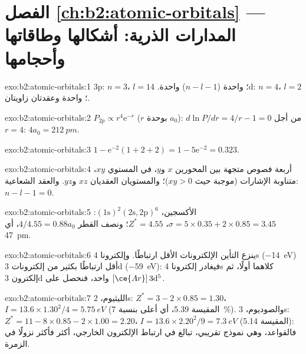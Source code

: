 \section*{الفصل \ref{ch:b2:atomic-orbitals} --- المدارات الذرية: أشكالها وطاقاتها وأحجامها}

\begin{solution}{exo:b2:atomic-orbitals:1}
3p: $n = 3$، $l = 1$؛  واحدة ($n - l - 1$)  واحدة. 4d: $n = 4$،
$l = 2$؛  واحدة وعقدتان زاويتان.
\end{solution}

\begin{solution}{exo:b2:atomic-orbitals:2}
$P_{2p} \propto r^4\mathrm e^{-r}$ ($r$ بوحدة $a_0$): $d\ln P/dr = 4/r - 1 = 0$ من أجل $r = 4$:
$4a_0 = \qty{212}{pm}$.
\end{solution}

\begin{solution}{exo:b2:atomic-orbitals:3}
$1 - \mathrm e^{-2}(1 + 2 + 2) = 1 - 5\mathrm e^{-2} = 0.323$.
\end{solution}

\begin{solution}{exo:b2:atomic-orbitals:4}
أربعة فصوص متجهة بين المحورين $x$ و$y$، في المستوي $xy$، متناوبة
الإشارات (موجبة حيث $xy > 0$)؛ والمستويان العقديان $xz$ و$yz$. والعقد الشعاعية:
$n - l - 1 = 0$.
\end{solution}

\begin{solution}{exo:b2:atomic-orbitals:5}
الأكسجين، $(1\mathrm s)^2(2\mathrm s, 2\mathrm p)^6$: $\sigma = 5 \times 0.35 + 2 \times 0.85
= 3.45$، $Z^* = 4.55$؛ ونصف القطر $4/4.55 = 0.88a_0$، أي \qty{47}{pm}.
\end{solution}

\begin{solution}{exo:b2:atomic-orbitals:6}
ينزع التأين الإلكترونات الأقل ارتباطًا. وإلكترونا 4s
(\qty{-14}{eV}) أقل ارتباطًا بكثير من إلكترونات 3d (\qty{-59}{eV}): فيغادر إلكترونا 4s
كلاهما أولًا، ثم إلكترون 3d واحد، فنحصل على $[\ce{Ar}]\,3\mathrm d^5$.
\end{solution}

\begin{solution}{exo:b2:atomic-orbitals:7}
الليثيوم، 2s: $Z^* = 3 - 2 \times 0.85 = 1.30$، $I = 13.6 \times 1.30^2/4 =
\qty{5.75}{eV}$ (المقيسة 5.39، أي أعلى بنسبة 7~\%). والصوديوم، 3s: $Z^* = 11 - 8 \times 0.85 -
2 \times 1.00 = 2.20$، $I = 13.6 \times 2.20^2/9 = \qty{7.3}{eV}$ (المقيسة 5.14): فالقواعد،
وهي نموذج تقريبي، تبالغ في ارتباط الإلكترون الخارجي، أكثر
فأكثر نزولًا في الزمرة.
\end{solution}

